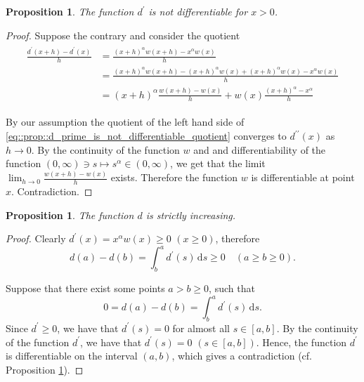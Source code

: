 \documentclass[12pt]{article}
\newcommand{\dd}{\,\mathrm{d}}
\newcommand{\dprime}{{\prime\prime}}
\renewcommand{\geq}{\geqslant}
\newcommand{\mapto}{\longmapsto}
\newcommand{\paren}[1]{\! \left( #1 \right) }
\theoremstyle{plain}
\newtheorem{proposition}[theorem]{Proposition}
\theoremstyle{definition}
\theoremstyle{remark}
\begin{document}
 
\begin{proposition} \label{prop::d_prime_is_not_differentiable}
    The function $d^\prime$ is not differentiable for $x>0$.
 \end{proposition}
\begin{proof}
    Suppose the contrary and consider the quotient
    \begin{align} \label{eq::prop::d_prime_is_not_differentiable_quotient}
      \begin{split}
          \frac{d^\prime\paren{x+h} - d^\prime\paren{x}}{h} & = \frac{\paren{x+h}^\alpha w\paren{x+h} - x^\alpha w\paren{x}}{h} \\
                                                            & = \frac{\paren{x+h}^\alpha w\paren{x+h} - \paren{x+h}^\alpha w\paren{x} + \paren{x+h}^\alpha w\paren{x} - x^\alpha w\paren{x}}{h} \\
                                                            & = \paren{x+h}^\alpha \frac{w\paren{x+h} - w\paren{x}}{h} + w\paren{x} \frac{\paren{x+h}^\alpha - x^\alpha}{h}
      \end{split}
    \end{align}

    By our assumption the quotient of the left hand side of \eqref{eq::prop::d_prime_is_not_differentiable_quotient} converges to $d^\dprime\paren{x}$ as $h \to 0$.
    By the continuity of the function $w$ and and differentiability of the function $\paren{0, \infty} \ni s \mapto s^\alpha \in \paren{0, \infty}$, we get that the limit $\lim_{h \to 0} \frac{w\paren{x+h}-w\paren{x}}{h}$ exists.
    Therefore the function $w$ is differentiable at point $x$.
    Contradiction.
\end{proof}

\begin{proposition} \label{prop::d_is_increasing}
    The function $d$ is strictly increasing.
\end{proposition}
\begin{proof}
    Clearly $d^\prime\paren{x} =x^\alpha w\paren{x} \geq 0$ $\paren{x \geq 0}$, therefore
    \begin{equation*} %
        d\paren{a} - d\paren{b} = \int^a_b d^\prime\paren{s} \dd s \geq 0 \quad \paren{a \geq b \geq 0}.
    \end{equation*}

    Suppose that there exist some points $a > b \geq 0$, such that
    \begin{equation*}
        0 = d\paren{a} - d\paren{b} = \int^a_b d^\prime\paren{s} \dd s.
    \end{equation*}
    Since $d^\prime \geq 0$, we have that $d^\prime\paren{s} = 0$ for almost all $s \in \left[a, b\right]$.
    By the continuity of the function $d^\prime$, we have that $d^\prime\paren{s} = 0$ $\paren{s \in  \left[a, b\right]}$.
    Hence, the function $d^\prime$ is differentiable on the interval $\paren{a, b}$, which gives a contradiction (cf. Proposition \ref{prop::d_prime_is_not_differentiable}).
\end{proof}
\end{document}
